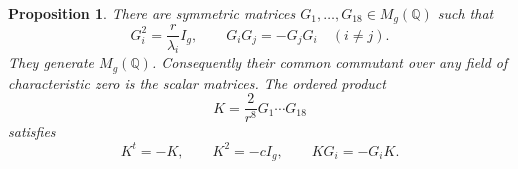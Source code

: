 \documentclass[11pt]{article}
\numberwithin{equation}{section}
\newtheorem{proposition}[theorem]{Proposition}
\theoremstyle{definition}
\theoremstyle{remark}
\newcommand{\Q}{\mathbb Q}
\begin{document}
\begin{proposition}\label{prop:clifford-matrices}
There are symmetric matrices $G_1,\ldots,G_{18}\in M_g(\Q)$ such that
\begin{equation}\label{eq:clifford-relations}
 G_i^2=\frac r{\lambda_i}I_g,\qquad
 G_iG_j=-G_jG_i\quad(i\ne j).
\end{equation}
They generate $M_g(\Q)$.  Consequently their common commutant over any
field of characteristic zero is the scalar matrices.  The ordered
product
\begin{equation}\label{eq:K-definition}
 K=\frac{2}{r^8}G_1\cdots G_{18}
\end{equation}
satisfies
\begin{equation}\label{eq:K-identities}
 K^t=-K,\qquad K^2=-cI_g,\qquad KG_i=-G_iK.
\end{equation}
\end{proposition}
\end{document}
